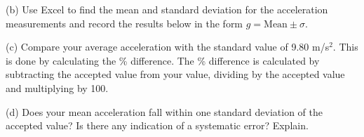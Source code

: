(b) Use Excel to find the mean and standard deviation for the acceleration
measurements and record the results below in the form $g = \mbox{Mean}
\pm \sigma$.
\vspace{10mm}

(c) Compare your average acceleration with the standard value of 9.80 m/s\( ^{2} \).
This is done by calculating the \% difference. The \% difference is calculated
by subtracting the accepted value from your value, dividing by the accepted
value and multiplying by 100.
\vspace{20mm}

(d) Does your mean acceleration fall within one standard deviation of the accepted
value? Is there any indication of a systematic error? Explain.

